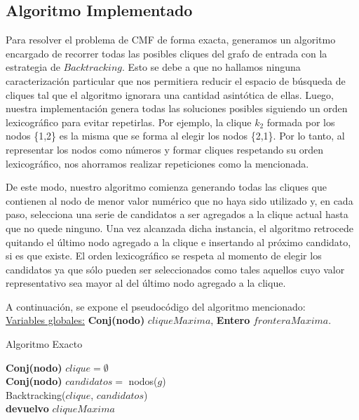 \subsection{Algoritmo Implementado}

Para resolver el problema de CMF de forma exacta, generamos un algoritmo encargado de recorrer todas las posibles cliques del grafo de entrada con la estrategia de $Backtracking$. Esto se debe a que no hallamos ninguna caracterización particular que nos permitiera reducir el espacio de búsqueda de cliques tal que el algoritmo ignorara una cantidad asintótica de ellas. Luego, nuestra implementación genera todas las soluciones posibles siguiendo un orden lexicográfico para evitar repetirlas. Por ejemplo, la clique $k_{2}$ formada por los nodos \{1,2\} es la misma que se forma al elegir los nodos \{2,1\}. Por lo tanto, al representar los nodos como números y formar cliques respetando su orden lexicográfico, nos ahorramos realizar repeticiones como la mencionada. 

De este modo, nuestro algoritmo comienza generando todas las cliques que contienen al nodo de menor valor numérico que no haya sido utilizado y, en cada paso, selecciona una serie de candidatos a ser agregados a la clique actual hasta que no quede ninguno. Una vez alcanzada dicha instancia, el algoritmo retrocede quitando el último nodo agregado a la clique e insertando al próximo candidato, si es que existe. El orden lexicográfico se respeta al momento de elegir los candidatos ya que sólo pueden ser seleccionados como tales aquellos cuyo valor representativo sea mayor al del último nodo agregado a la clique.

A continuación, se expone el pseudocódigo del algoritmo mencionado:\\

\underline{Variables globales:} \textbf{Conj(nodo)} $cliqueMaxima$, \textbf{Entero} $fronteraMaxima$.\\

\begin{algorithm}[H]
	\SetAlgoLined
	\caption{Algoritmo Exacto}

	\textbf{Conj(nodo)} $clique = \emptyset$\\
	\textbf{Conj(nodo)} $candidatos = $ nodos($g$)\\

	Backtracking($clique$, $candidatos$)\\

	\textbf{devuelvo} $cliqueMaxima$\\

\end{algorithm}

